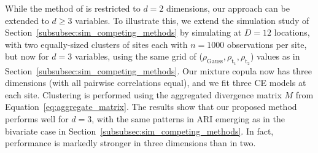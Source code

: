 \documentclass[12pt,compact]{article}
\newcommand{\JSGa}{\mathop{\mathrm{JS}^{\mathrm{G}_{\lambda}}}\nolimits}
\newcommand{\rhou}[1]{\rho_{\text{#1}}}
\begin{document}
While the method of \citet{Vignotto2021} is restricted to $d = 2$ dimensions, our approach can be extended to $d \geq 3$ variables. 
To illustrate this, we extend the simulation study of Section~\ref{subsubsec:sim_competing_methods} by simulating at $D = 12$ locations, with two equally-sized clusters of sites each with $n = 1000$ observations per site, but now for $d = 3$ variables, using the same grid of ($\rhou{Gauss}, \rho_{\text{t}_1}, \rho_{\text{t}_2}$) values as in Section~\ref{subsubsec:sim_competing_methods}.
Our mixture copula now has three dimensions (with all pairwise correlations equal), and we fit three CE models at each site. 
Clustering is performed using the aggregated divergence matrix $M$ from Equation~\eqref{eq:aggregate_matrix}.
The results show that our proposed method performs well for $d =3$, with the same patterns in ARI emerging as in the bivariate case in Section~\ref{subsubsec:sim_competing_methods}.
In fact, performance is markedly stronger in three dimensions than in two. 
\end{document}
